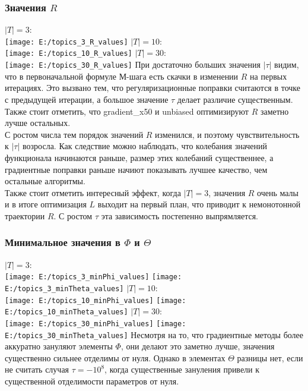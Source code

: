 \documentclass[12pt]{article}
\begin{document}
\subsubsection{Значения $R$}
$|T| = 3$:\\
\texttt{[image: E:/topics\_3\_R\_values]}
$|T| = 10$:\\
\texttt{[image: E:/topics\_10\_R\_values]}
$|T| = 30$:\\
\texttt{[image: E:/topics\_30\_R\_values]}
При достаточно больших значения $|\tau|$ видим, что в первоначальной формуле М-шага есть скачки в изменении $R$ на первых итерациях. Это вызвано тем, что регуляризационные поправки считаются в точке с предыдущей итерации, а большое значение $\tau$ делает различие существенным. Также стоит отметить, что gradient\_x50 и unbiased оптимизируют $R$ заметно лучше остальных.\\
С ростом числа тем порядок значений $R$ изменился, и поэтому чувствительность к $|\tau|$ возросла. Как следствие можно наблюдать, что колебания значений функционала начинаются раньше, размер этих колебаний существеннее, а градиентные поправки раньше начиют показывать лучшее качество, чем остальные алгоритмы.\\
Также стоит отметить интересный эффект, когда $|T| = 3$, значения $R$ очень малы и в итоге оптимизация $L$ выходит на первый план, что приводит к немонотонной траектории $R$. С ростом $\tau$ эта зависимость постепенно выпрямляется.
\subsubsection{Минимальное значения в $\Phi$ и $\Theta$}
$|T| = 3$:\\
\texttt{[image: E:/topics\_3\_minPhi\_values]}
\texttt{[image: E:/topics\_3\_minTheta\_values]}
$|T| = 10$:\\
\texttt{[image: E:/topics\_10\_minPhi\_values]}
\texttt{[image: E:/topics\_10\_minTheta\_values]}
$|T| = 30$:\\
\texttt{[image: E:/topics\_30\_minPhi\_values]}
\texttt{[image: E:/topics\_30\_minTheta\_values]}
Несмотря на то, что градиентные методы более аккуратно  зануляют элементы $\Phi$, они делают это заметно лучше, значения существенно сильнее отделимы от нуля. Однако в элементах $\Theta$ разницы нет, если не считать случая $\tau = -10^{8}$, когда существенные зануления привели к существенной отделимости параметров от нуля.
\end{document}

